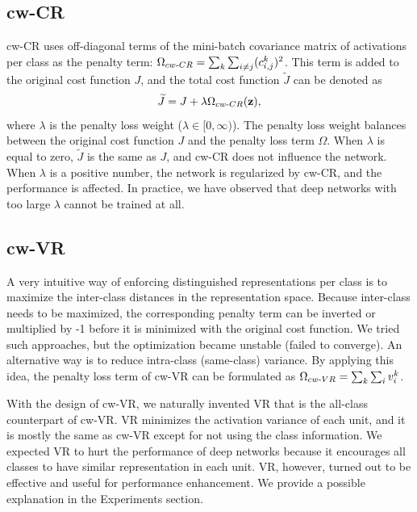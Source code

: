 \documentclass[letterpaper]{article} %
\begin{document}
\subsection{cw-CR}
cw-CR uses off-diagonal terms of the mini-batch covariance matrix of activations per class as the penalty term: ${\Omega}_{cw{\text -}CR}=\sum_k \sum_{i\neq j} (c_{i,j}^{k})^{2}$. This term is added to the original cost function $J$, and the total cost function $\widetilde{J}$ can be denoted as  
\begin{align}
    \widetilde{J}=J+\lambda{\Omega}_{cw{\text -}CR}(\mathbf{z}),
\end{align}
where $\lambda$ is the penalty loss weight ($\lambda \in [0, \infty)$). The penalty loss weight balances between the original cost function $J$ and the penalty loss term $\Omega$. When $\lambda$ is equal to zero, $\widetilde{J}$ is the same as $J$, and cw-CR does not influence the network. When $\lambda$ is a positive number, the network is regularized by cw-CR, and the performance is affected. In practice, we have observed that deep networks with too large $\lambda$ cannot be trained at all.

\subsection{cw-VR}
A very intuitive way of enforcing distinguished representations per class is to maximize the inter-class distances in the representation space. 
Because inter-class needs to be maximized, the corresponding penalty term can be inverted or multiplied by -1 before it is minimized with the original cost function. 
We tried such approaches, but the optimization became unstable (failed to converge).
%
An alternative way is to reduce intra-class (same-class) variance. By applying this idea, the penalty loss term of cw-VR can be formulated as ${\Omega}_{cw{\text -}VR}=\sum_k \sum_i v_{i}^k$. 

With the design of cw-VR, we naturally invented VR that is the all-class counterpart of cw-VR. VR minimizes the activation variance of each unit, and it is mostly the same as cw-VR except for not using the class information. We expected VR to hurt the performance of deep networks because it encourages all classes to have similar representation in each unit. VR, however, turned out to be effective and useful for performance enhancement. We provide a possible explanation in the Experiments section. 
\end{document}
